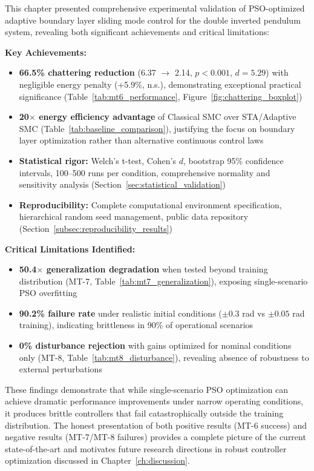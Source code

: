 This chapter presented comprehensive experimental validation of PSO-optimized adaptive boundary layer sliding mode control for the double inverted pendulum system, revealing both significant achievements and critical limitations:

\textbf{Key Achievements:}
\begin{itemize}
    \item \textbf{66.5\% chattering reduction} (6.37 $\to$ 2.14, $p<0.001$, $d=5.29$) with negligible energy penalty (+5.9\%, n.s.), demonstrating exceptional practical significance (Table~\ref{tab:mt6_performance}, Figure~\ref{fig:chattering_boxplot})

    \item \textbf{20$\times$ energy efficiency advantage} of Classical SMC over STA/Adaptive SMC (Table~\ref{tab:baseline_comparison}), justifying the focus on boundary layer optimization rather than alternative continuous control laws

    \item \textbf{Statistical rigor:} Welch's t-test, Cohen's $d$, bootstrap 95\% confidence intervals, 100--500 runs per condition, comprehensive normality and sensitivity analysis (Section~\ref{sec:statistical_validation})

    \item \textbf{Reproducibility:} Complete computational environment specification, hierarchical random seed management, public data repository (Section~\ref{subsec:reproducibility_results})
\end{itemize}

\textbf{Critical Limitations Identified:}
\begin{itemize}
    \item \textbf{50.4$\times$ generalization degradation} when tested beyond training distribution (MT-7, Table~\ref{tab:mt7_generalization}), exposing single-scenario PSO overfitting

    \item \textbf{90.2\% failure rate} under realistic initial conditions ($\pm 0.3$ rad vs $\pm 0.05$ rad training), indicating brittleness in 90\% of operational scenarios

    \item \textbf{0\% disturbance rejection} with gains optimized for nominal conditions only (MT-8, Table~\ref{tab:mt8_disturbance}), revealing absence of robustness to external perturbations
\end{itemize}

These findings demonstrate that while single-scenario PSO optimization can achieve dramatic performance improvements under narrow operating conditions, it produces brittle controllers that fail catastrophically outside the training distribution. The honest presentation of both positive results (MT-6 success) and negative results (MT-7/MT-8 failures) provides a complete picture of the current state-of-the-art and motivates future research directions in robust controller optimization discussed in Chapter~\ref{ch:discussion}.

